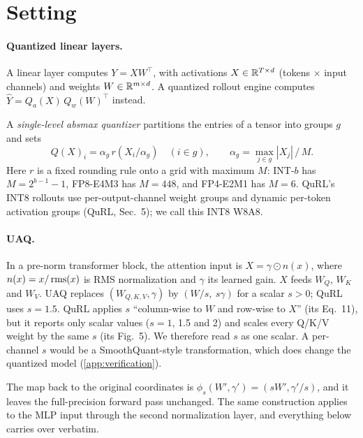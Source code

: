 \section{Setting}\label{sec:setting}

\paragraph{Quantized linear layers.} A linear layer computes $Y=XW^\top$, with activations $X\in\mathbb{R}^{T\times d}$ (tokens $\times$ input channels) and weights $W\in\mathbb{R}^{m\times d}$. A quantized rollout engine computes $\hat Y=Q_a(X)\,Q_w(W)^\top$ instead.

A \emph{single-level absmax quantizer} partitions the entries of a tensor into groups $g$ and sets
\begin{equation}\label{eq:absmax}
Q(X)_i=\alpha_g\,r\!\left(X_i/\alpha_g\right)\quad(i\in g),\qquad \alpha_g=\max_{j\in g}|X_j|\,/\,M .
\end{equation}
Here $r$ is a fixed rounding rule onto a grid with maximum $M$: INT-$b$ has $M=2^{b-1}-1$, FP8-E4M3 has $M=448$, and FP4-E2M1 has $M=6$. QuRL's INT8 rollouts use per-output-channel weight groups and dynamic per-token activation groups (QuRL, Sec.~5); we call this INT8 W8A8.

\paragraph{UAQ.} In a pre-norm transformer block, the attention input is $X=\gamma\odot n(x)$, where $n(x)=x/\operatorname{rms}(x)$ is RMS normalization and $\gamma$ its learned gain. $X$ feeds $W_Q$, $W_K$ and $W_V$. UAQ replaces $(W_{Q,K,V},\gamma)$ by $(W/s,\ s\gamma)$ for a scalar $s>0$; QuRL uses $s=1.5$. QuRL applies $s$ ``column-wise to $W$ and row-wise to $X$'' (its Eq.~11), but it reports only scalar values ($s=1$, 1.5 and 2) and scales every Q/K/V weight by the same $s$ (its Fig.~5). We therefore read $s$ as one scalar. A per-channel $s$ would be a SmoothQuant-style transformation, which does change the quantized model (\cref{app:verification}).

The map back to the original coordinates is $\phi_s(W',\gamma')=(sW',\gamma'/s)$, and it leaves the full-precision forward pass unchanged. The same construction applies to the MLP input through the second normalization layer, and everything below carries over verbatim.


